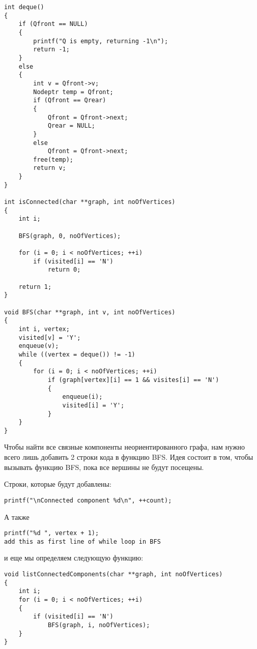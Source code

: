 \begin{tcolorbox}
\begin{verbatim}
int deque()
{
	if (Qfront == NULL)
	{
		printf("Q is empty, returning -1\n");
		return -1;
	}
	else
	{
		int v = Qfront->v;
		Nodeptr temp = Qfront;
		if (Qfront == Qrear)
		{
			Qfront = Qfront->next;
			Qrear = NULL;
		}
		else
			Qfront = Qfront->next;
		free(temp);
		return v;
	}
}

int isConnected(char **graph, int noOfVertices)
{
	int i;
	
	BFS(graph, 0, noOfVertices);
	
	for (i = 0; i < noOfVertices; ++i)
		if (visited[i] == 'N')
			return 0;
	
	return 1;
}

void BFS(char **graph, int v, int noOfVertices)
{
	int i, vertex;
	visited[v] = 'Y';
	enqueue(v);
	while ((vertex = deque()) != -1)
	{
		for (i = 0; i < noOfVertices; ++i)
			if (graph[vertex][i] == 1 && visites[i] == 'N')
			{
				enqueue(i);
				visited[i] = 'Y';
			}
	}
}
\end{verbatim}
\end{tcolorbox}

Чтобы найти все связные компоненты неориентированного графа, нам нужно всего лишь добавить 2 строки кода в функцию BFS. Идея состоит в том, чтобы вызывать функцию BFS, пока все вершины не будут посещены.

\vspace{\baselineskip}

Строки, которые будут добавлены:

\begin{tcolorbox}
\begin{verbatim}
printf("\nConnected component %d\n", ++count);
\end{verbatim}
\end{tcolorbox}

А также

\begin{tcolorbox}
\begin{verbatim}
printf("%d ", vertex + 1);
add this as first line of while loop in BFS
\end{verbatim}
\end{tcolorbox}

и еще мы определяем следующую функцию:

\begin{tcolorbox}
\begin{verbatim}
void listConnectedComponents(char **graph, int noOfVertices)
{
	int i;
	for (i = 0; i < noOfVertices; ++i)
	{
		if (visited[i] == 'N')
			BFS(graph, i, noOfVertices);
	}
}
\end{verbatim}
\end{tcolorbox}

